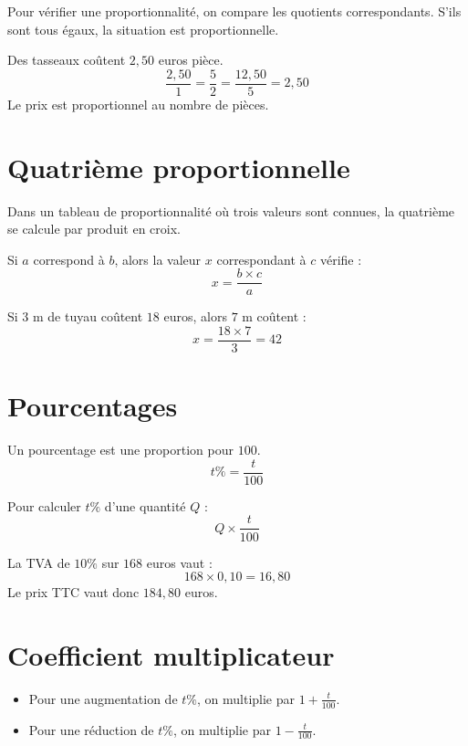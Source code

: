 \documentclass[11pt,a4paper,twoside]{book}
\begin{document}
\begin{methodebox}
Pour vérifier une proportionnalité, on compare les quotients correspondants.
S'ils sont tous égaux, la situation est proportionnelle.
\end{methodebox}

\begin{exemplebox}
Des tasseaux coûtent \(2{,}50\) euros pièce.
\[
\frac{2{,}50}{1}=\frac{5}{2}=\frac{12{,}50}{5}=2{,}50
\]
Le prix est proportionnel au nombre de pièces.
\end{exemplebox}

\section{Quatrième proportionnelle}
\begin{definitionbox}
Dans un tableau de proportionnalité où trois valeurs sont connues,
la quatrième se calcule par produit en croix.
\end{definitionbox}

\begin{methodebox}
Si \(a\) correspond à \(b\), alors la valeur \(x\) correspondant à \(c\) vérifie :
\[
x=\frac{b\times c}{a}
\]
\end{methodebox}

\begin{exemplebox}
Si \(3\) m de tuyau coûtent \(18\) euros, alors \(7\) m coûtent :
\[
x=\frac{18\times 7}{3}=42
\]
\end{exemplebox}

\section{Pourcentages}
\begin{definitionbox}
Un pourcentage est une proportion pour \(100\).
\[
t\%= \frac{t}{100}
\]
\end{definitionbox}

\begin{methodebox}
Pour calculer \(t\%\) d'une quantité \(Q\) :
\[
Q\times \frac{t}{100}
\]
\end{methodebox}

\begin{exemplebox}
La TVA de \(10\%\) sur \(168\) euros vaut :
\[
168\times 0{,}10=16{,}80
\]
Le prix TTC vaut donc \(184{,}80\) euros.
\end{exemplebox}

\section{Coefficient multiplicateur}
\begin{definitionbox}
\begin{itemize}
\item Pour une augmentation de \(t\%\), on multiplie par \(1+\frac{t}{100}\).
\item Pour une réduction de \(t\%\), on multiplie par \(1-\frac{t}{100}\).
\end{itemize}
\end{definitionbox}
\end{document}
